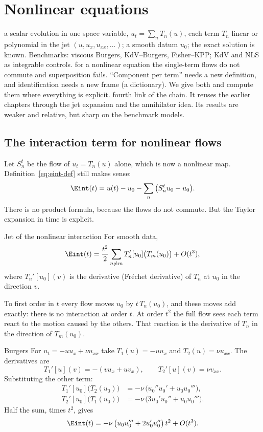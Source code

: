 \chapter{Nonlinear equations}\label{ch:nonlin}
\chapterbrief
{a scalar evolution in one space variable, $u_t=\sum_nT_n(u)$, each term $T_n$ linear or polynomial in the jet $(u,u_x,u_{xx},\dots)$; a smooth datum $u_0$; the exact solution is known. Benchmarks: viscous Burgers, KdV--Burgers, Fisher--KPP; KdV and NLS as integrable controls.}
{for a nonlinear equation the single-term flows do not commute and superposition fails. ``Component per term'' needs a new definition, and identification needs a new frame (a dictionary). We give both and compute them where everything is explicit.}
{fourth link of the chain. It reuses the earlier chapters through the jet expansion and the annihilator idea. Its results are weaker and relative, but sharp on the benchmark models.}

\section{The interaction term for nonlinear flows}

Let $S_n^t$ be the flow of $u_t=T_n(u)$ alone, which is now a nonlinear map. Definition~\eqref{eq:eint-def} still makes sense:
\[
\Eint(t)=u(t)-u_0-\sum_n\big(S_n^tu_0-u_0\big).
\]
There is no product formula, because the flows do not commute. But the Taylor expansion in time is explicit.

\begin{theorem}{Jet of the nonlinear interaction  \proved}\label{thm:jet}
For smooth data,
\[
\Eint(t)=\frac{t^2}{2}\sum_{n\ne m}T_n'[u_0]\big(T_m(u_0)\big)+O(t^3),
\]
where $T_n'[u_0](v)$ is the derivative (Fr\'echet derivative) of $T_n$ at $u_0$ in the direction $v$.

\end{theorem}

\begin{intuition}
To first order in $t$ every flow moves $u_0$ by $t\,T_n(u_0)$, and these moves add exactly: there is no interaction at order $t$. At order $t^2$ the full flow sees each term react to the motion caused by the others. That reaction is the derivative of $T_n$ in the direction of $T_m(u_0)$.
\end{intuition}

\begin{example}{Burgers}\label{ex:burgers-jet}
For $u_t=-uu_x+\nu u_{xx}$ take $T_1(u)=-uu_x$ and $T_2(u)=\nu u_{xx}$. The derivatives are
\[
T_1'[u](v)=-(vu_x+uv_x),\qquad T_2'[u](v)=\nu v_{xx}.
\]
Substituting the other term:
\begin{align*}
T_1'[u_0]\big(T_2(u_0)\big)&=-\nu\,\big(u_0''u_0'+u_0u_0'''\big),\\
T_2'[u_0]\big(T_1(u_0)\big)&=-\nu\,\big(3u_0'u_0''+u_0u_0'''\big).
\end{align*}
Half the sum, times $t^2$, gives
\[
\Eint(t)=-\nu\,\big(u_0u_0'''+2u_0'u_0''\big)\,t^2+O(t^3).
\]
\end{example}

